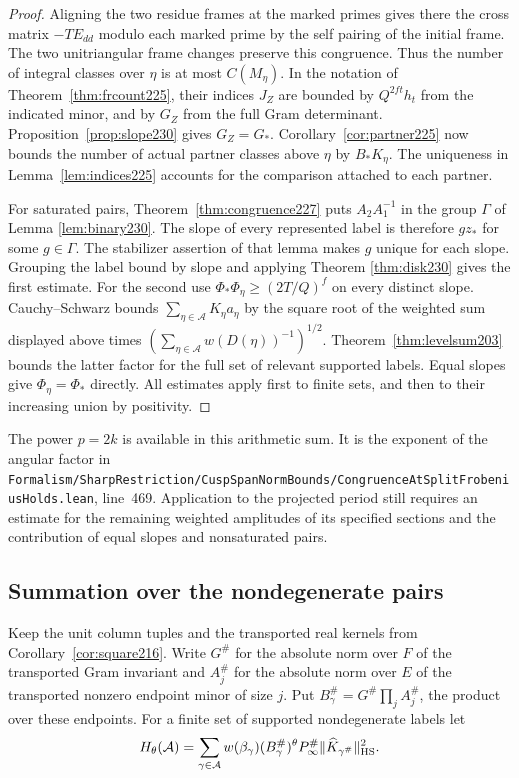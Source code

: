 \documentclass[a4paper,11pt]{article}
\theoremstyle{definition}
\theoremstyle{remark}
\newcommand{\srcloc}[2]{{\small\nolinkurl{#1.lean}}, line~#2}
\numberwithin{equation}{section}
\begin{document}
\begin{proof}
Aligning the two residue frames at the marked primes gives
there the cross matrix \(-T E_{dd}\) modulo each marked prime
by the self pairing of the initial frame. The two unitriangular frame changes
preserve this congruence. Thus the number of integral classes
over \(\eta\) is at most \(C(M_\eta)\). In the notation of
Theorem~\ref{thm:frcount225}, their indices \(J_Z\) are bounded
by \(Q^{2ft}h_t\) from the indicated minor, and by \(G_Z\)
from the full Gram determinant. Proposition~\ref{prop:slope230}
gives \(G_Z=G_*\). Corollary~\ref{cor:partner225} now bounds
the number of actual partner classes above \(\eta\) by
\(B_*K_\eta\). The uniqueness in Lemma~\ref{lem:indices225}
accounts for the comparison attached to each partner.

For saturated pairs, Theorem~\ref{thm:congruence227} puts
\(A_2A_1^{-1}\) in the group \(\Gamma\) of Lemma \ref{lem:binary230}.
The slope of every represented label is therefore \(gz_*\)
for some \(g\in\Gamma\). The stabilizer assertion of that
lemma makes \(g\) unique for each slope. Grouping the label
bound by slope and applying Theorem
\ref{thm:disk230}
gives the first estimate. For the second use
\(\Phi_*\Phi_\eta\ge(2T/Q)^f\) on every distinct slope.
Cauchy--Schwarz bounds \(\sum_{\eta\in\mathcal A}K_\eta a_\eta\)
by the square root of the weighted sum displayed above times
\((\sum_{\eta\in\mathcal A}w(D(\eta))^{-1})^{1/2}\).
Theorem~\ref{thm:levelsum203} bounds the latter factor for the
full set of relevant supported labels. Equal slopes give
\(\Phi_\eta=\Phi_*\) directly. All estimates apply first to
finite sets, and then to their increasing union by positivity.
\end{proof}

The power \(p=2k\) is available in this arithmetic sum. It is
the exponent of the angular factor in
\srcloc{Formalism/SharpRestriction/CuspSpanNormBounds/CongruenceAtSplitFrobeniusHolds}{469}.
Application to the projected period still requires an estimate
for the remaining weighted amplitudes of its specified sections
and the contribution of equal slopes and nonsaturated pairs.

\subsection{Summation over the nondegenerate pairs}\label{nav:IX-24}
Keep the unit column tuples and the transported real kernels
from Corollary~\ref{cor:square216}. Write \(G^\#\) for the
absolute norm over \(F\) of the transported Gram invariant and
\(A_j^\#\) for the absolute norm over \(E\) of the transported
nonzero endpoint minor of size \(j\). Put
\(B_\gamma^\#=G^\#\prod_{j}A_j^\#\), the product over these
endpoints. For a finite set of supported nondegenerate labels
let
\[
 H_\theta(\mathcal A)=\sum_{\gamma\in\mathcal A}
       w(\beta_\gamma)(B_\gamma^\#)^\theta
                   P_\infty^\#\|\widehat K_{\gamma^\#}\|_{\rm HS}^2 .
\]
\end{document}
